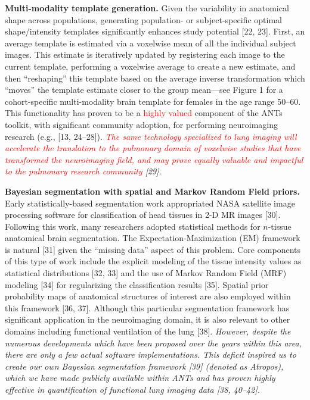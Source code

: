 \documentclass[11pt,]{article}
\begin{document}
\textbf{Multi-modality template generation.} Given the variability in
anatomical shape across populations, generating population- or
subject-specific optimal shape/intensity templates significantly
enhances study potential {[}22, 23{]}. First, an average template is
estimated via a voxelwise mean of all the individual subject images.
This estimate is iteratively updated by registering each image to the
current template, performing a voxelwise average to create a new
estimate, and then ``reshaping'' this template based on the average
inverse transformation which ``moves'' the template estimate closer to
the group mean---see Figure 1 for a cohort-specific multi-modality brain
template for females in the age range 50--60. This functionality has
proven to be a \textcolor{red}{highly valued} component of the ANTs
toolkit, with significant community adoption, for performing
neuroimaging research (e.g., {[}13, 24--28{]}).
\emph{\textcolor{red}{The same technology specialized to lung imaging will accelerate the
translation to the pulmonary domain of voxelwise studies that have transformed the
neuroimaging field, and may prove equally valuable and impactful to the pulmonary
research community} {[}29{]}.}

\textbf{Bayesian segmentation with spatial and Markov Random Field
priors.} Early statistically-based segmentation work appropriated NASA
satellite image processing software for classification of head tissues
in 2-D MR images {[}30{]}. Following this work, many researchers adopted
statistical methods for \(n\)-tissue anatomical brain segmentation. The
Expectation-Maximization (EM) framework is natural {[}31{]} given the
``missing data'' aspect of this problem. Core components of this type of
work include the explicit modeling of the tissue intensity values as
statistical distributions {[}32, 33{]} and the use of Markov Random
Field (MRF) modeling {[}34{]} for regularizing the classification
results {[}35{]}. Spatial prior probability maps of anatomical
structures of interest are also employed within this framework {[}36,
37{]}. Although this particular segmentation framework has significant
application in the neuroimaging domain, it is also relevant to other
domains including functional ventilation of the lung {[}38{]}.
\emph{However, despite the numerous developments which have been
proposed over the years within this area, there are only a few actual
software implementations. This deficit inspired us to create our own
Bayesian segmentation framework {[}39{]} (denoted as Atropos), which we
have made publicly available within ANTs and has proven highly effective
in quantification of functional lung imaging data {[}38, 40--42{]}.}
\end{document}

